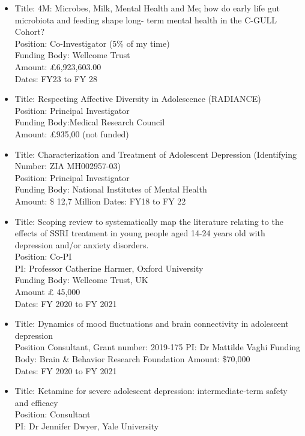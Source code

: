 \documentclass[
]{article}
\begin{document}
\begin{itemize}
\item
  Title: 4M: Microbes, Milk, Mental Health and Me; how do early life gut
  microbiota and feeding shape long- term mental health in the C-GULL
  Cohort?\\
  Position: Co-Investigator (5\% of my time)\\
  Funding Body: Wellcome Trust\\
  Amount: £6,923,603.00\\
  Dates: FY23 to FY 28
\item
  Title: Respecting Affective Diversity in Adolescence (RADIANCE)\\
  Position: Principal Investigator\\
  Funding Body:Medical Research Council\\
  Amount: £935,00 (not funded)
\item
  Title: Characterization and Treatment of Adolescent Depression
  (Identifying Number: ZIA MH002957-03)\\
  Position: Principal Investigator\\
  Funding Body: National Institutes of Mental Health\\
  Amount: \$ 12,7 Million Dates: FY18 to FY 22
\item
  Title: Scoping review to systematically map the literature relating to
  the effects of SSRI treatment in young people aged 14-24 years old
  with depression and/or anxiety disorders.\\
  Position: Co-PI\\
  PI: Professor Catherine Harmer, Oxford University\\
  Funding Body: Wellcome Trust, UK\\
  Amount £ 45,000\\
  Dates: FY 2020 to FY 2021
\item
  Title: Dynamics of mood fluctuations and brain connectivity in
  adolescent depression\\
  Position Consultant, Grant number: 2019-175 PI: Dr Mattilde Vaghi
  Funding Body: Brain \& Behavior Research Foundation Amount: \$70,000\\
  Dates: FY 2020 to FY 2021
\item
  Title: Ketamine for severe adolescent depression: intermediate-term
  safety and efficacy\\
  Position: Consultant\\
  PI: Dr Jennifer Dwyer, Yale University\\

\end{itemize}
\end{document}
